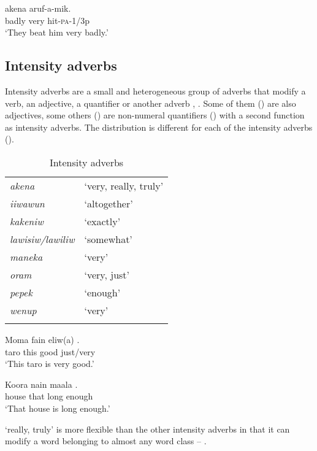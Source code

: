 \ea%
\label{ex:3:x506}
\gll {} akena aruf-a-mik. \\
badly very hit-\textsc{pa}-1/3p\\
\glt`They beat him very badly.'
\z

\subsection{Intensity adverbs}\label{sec:3.9.2}
{}
Intensity adverbs are a small and heterogeneous group of adverbs that modify a verb, an adjective, a quantifier or another adverb , . Some of them () are also adjectives, some others () are non-numeral quantifiers () with a second function as intensity adverbs. The distribution is different for each of the intensity adverbs ().

\begin{table}
\caption{Intensity adverbs}
\label{tab:3:intensityadverbs}

\begin{tabular}{>{\itshape}ll}
\mytoprule
akena &`very, really, truly'\\
iiwawun &`altogether'\\
kakeniw &`exactly'\\
lawisiw/lawiliw &`somewhat'\\
maneka &`very'\\
oram &`very, just'\\
pepek &`enough'\\
wenup &`very'\\
\mybottomrule 
\end{tabular}
\end{table}

\ea%
\label{ex:3:x508}
\gll Moma fain eliw(a) . \\
taro this good just/very \\
\glt`This taro is very good.'
\z

\ea%
\label{ex:3:x510}
\gll Koora nain maala . \\
house that long enough\\
\glt`That house is long enough.'
\z

 `really, truly' is more flexible than the other intensity adverbs in that it can modify a word belonging to almost any word class  -- .

